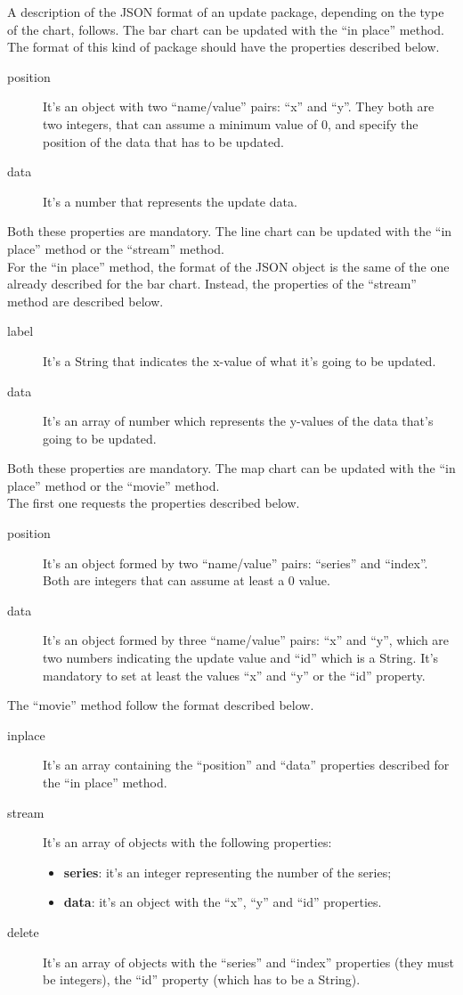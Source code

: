 	A description of the JSON format of an update package, depending on the type of the chart, follows. 
		The bar chart can be updated with the “in place” method. The format of this kind of package should have the properties described below.
		\begin{description}
			\item[position] It's an object with two “name/value” pairs: “x” and “y”. They both are two integers, that can assume a minimum value of 0, and specify the position of the data that has to be updated.
			\item[data] It's a number that represents the update data.
		\end{description}
		Both these properties are mandatory.
		The line chart can be updated with the “in place” method or the “stream” method. \\
		For the “in place” method, the format of the JSON object is the same of the one already described for the bar chart. Instead, the properties of the “stream” method are described below.
		\begin{description}
			\item[label] It's a String that indicates the x-value of what it's going to be updated.
			\item[data] It's an array of number which represents the y-values of the data that's going to be updated.
		\end{description}
		Both these properties are mandatory.
		The map chart can be updated with the “in place” method or the “movie” method. \\
		The first one requests the properties described below.
		\begin{description}
			\item[position] It's an object formed by two “name/value” pairs: “series” and “index”. Both are integers that can assume at least a 0 value.
			\item[data] It's an object formed by three “name/value” pairs: 
			“x” and “y”, which are two numbers indicating the update value and “id” which is a String. It's mandatory to set at least the values “x” and “y” or the “id” property.
		\end{description}
		The “movie” method follow the format described below.
		\begin{description}
			\item[inplace] It's an array containing the “position” and “data” properties described for the “in place” method.
			\item[stream] It's an array of objects with the following properties:
			\begin{itemize}
				\item \textbf{series}: it's an integer representing the number of the series;
				\item \textbf{data}: it's an object with the “x”, “y” and “id” properties.
			\end{itemize}
			\item[delete] It's an array of objects with the “series” and “index” properties (they must be integers), the “id” property (which has to be a String).
		\end{description}
